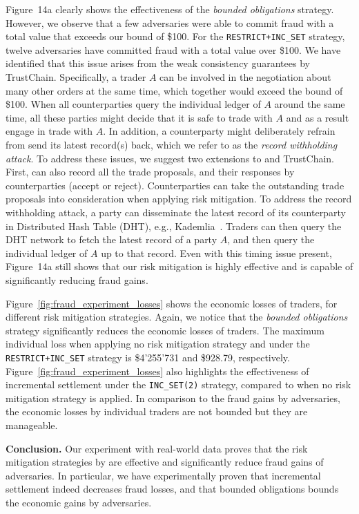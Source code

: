 Figure~14a clearly shows the effectiveness of the \emph{bounded obligations} strategy.
However, we observe that a few adversaries were able to commit fraud with a total value that exceeds our bound of \$100.
For the \texttt{RESTRICT+INC\_SET} strategy, twelve adversaries have committed fraud with a total value over \$100.
We have identified that this issue arises from the weak consistency guarantees by TrustChain.
Specifically, a trader $ A $ can be involved in the negotiation about many other orders at the same time, which together would exceed the bound of \$100.
When all counterparties query the individual ledger of $ A $ around the same time, all these parties might decide that it is safe to trade with $ A $ and as a result engage in trade with $ A $.
In addition, a counterparty might deliberately refrain from send its latest record(s) back, which we refer to as the \emph{record withholding attack}.
To address these issues, we suggest two extensions to \ModelName{} and TrustChain.
First, \ModelName{} can also record all the trade proposals, and their responses by counterparties (accept or reject).
Counterparties can take the outstanding trade proposals into consideration when applying risk mitigation.
To address the record withholding attack, a party can disseminate the latest record of its counterparty in Distributed Hash Table (DHT), e.g., Kademlia~\cite{maymounkov2002kademlia}.
Traders can then query the DHT network to fetch the latest record of a party $ A $, and then query the individual ledger of $ A $ up to that record.
Even with this timing issue present, Figure~14a still shows that our risk mitigation is highly effective and is capable of significantly reducing fraud gains.

Figure~\ref{fig:fraud_experiment_losses} shows the economic losses of traders, for different risk mitigation strategies.
Again, we notice that the \emph{bounded obligations} strategy significantly reduces the economic losses of traders.
The maximum individual loss when applying no risk mitigation strategy and under the \texttt{RESTRICT+INC\_SET} strategy is \$4'255'731 and \$928.79, respectively.
Figure~\ref{fig:fraud_experiment_losses} also highlights the effectiveness of incremental settlement under the \texttt{INC\_SET(2)} strategy, compared to when no risk mitigation strategy is applied.
In comparison to the fraud gains by adversaries, the economic losses by individual traders are not bounded but they are manageable.

\textbf{Conclusion.}
Our experiment with real-world data proves that the risk mitigation strategies by \ModelName{} are effective and significantly reduce fraud gains of adversaries.
In particular, we have experimentally proven that incremental settlement indeed decreases fraud losses, and that bounded obligations bounds the economic gains by adversaries.

